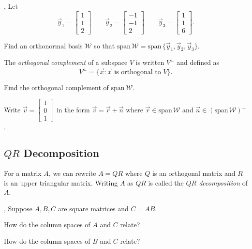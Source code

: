 \documentclass{article}
\renewcommand{\span}{\mathrm{span}\,}
\newcommand{\mat}[1]{\begin{bmatrix}#1\end{bmatrix}}
\begin{document}
	\sep
	Let
	\[
		\vec y_1=\mat{1\\1\\2}\qquad 
		\vec y_2=\mat{-1\\-1\\2}\qquad
		\vec y_3=\mat{1\\1\\6}.
	\]
	\begin{Enum}
		\item Find an orthonormal basis $\mathcal W$ so that $\span\mathcal W=
			\span\{\vec y_1,\vec y_2,\vec y_3\}$.
	\end{Enum}

	\begin{Def}
		The \emph{orthogonal complement} of a subspace $V$ is written
		$V^\perp$ and defined as
		\[
			V^\perp=\{\vec x:\vec x\text{ is orthogonal to }V\}.
		\]
		\vspace{-.2in}
	\end{Def}

	\begin{Enum}[resume]
		\item Find the orthogonal complement of $\span \mathcal W$.
		\item Write $\vec v=\mat{1\\0\\1}$ in the form $\vec v=\vec r+\vec n$ where 
			$\vec r\in\span\mathcal W$ and $\vec n\in(\span \mathcal W)^\perp$.
	\end{Enum}


\subsection*{$QR$ Decomposition}

	\begin{Def}
		For a matrix $A$, we can rewrite $A=QR$ where $Q$ is an
		orthogonal matrix and $R$ is an upper triangular matrix.  Writing
		$A$ as $QR$ is called the \emph{$QR$ decomposition} of $A$.
	\end{Def}

	\sep
	Suppose $A,B,C$ are square matrices and $C=AB$.
	\begin{Enum}
		\item How do the column spaces of $A$ and $C$ relate?
		\item How do the column spaces of $B$ and $C$ relate?
	\end{Enum}
\end{document}
